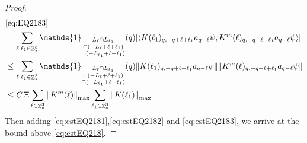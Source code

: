 \documentclass[sn-mathphys, Numbered ,a4paper]{sn-jnl}%
\DeclareMathOperator{\Z}{\mathbb{Z}}
\newcommand{\eva}[1]{\left\langle #1 \right\rangle}
\theoremstyle{plain}
\theoremstyle{definition}
\theoremstyle{remark}
\theoremstyle{plain}
\theoremstyle{definition}
\theoremstyle{remark}
\begin{document}
\begin{proof}
\begin{align}
	& \eqref{eq:EQ2183}\nonumber\\
	&= \sum\limits_{\ell, \ell_1\in \Z^3_*} \mathds{1}_{\substack{L_{\ell}\cap L_{\ell_1}\\\cap (-L_{\ell}+\ell+\ell_1) \\ \cap (-L_{\ell_1}+\ell+\ell_1)}} (q) \abs{\eva{K(\ell_1)_{q,-q+\ell+\ell_1} a_{q-\ell} \psi, K^m(\ell)_{q,-q+\ell+\ell_1} a_{q-\ell}\psi }}\nonumber\\
	&\leq \sum\limits_{\ell, \ell_1\in \Z^3_*} \mathds{1}_{\substack{L_{\ell}\cap L_{\ell_1}\\\cap (-L_{\ell}+\ell+\ell_1) \\ \cap (-L_{\ell_1}+\ell+\ell_1)}} (q) \norm{K(\ell_1)_{q,-q+\ell+\ell_1} a_{q-\ell} \psi}\norm{ K^m(\ell)_{q,-q+\ell+\ell_1} a_{q-\ell}\psi }\nonumber\\
	&\leq C\,\Xi \sum\limits_{\ell \in \Z^3_*} \norm{K^m(\ell)}_{\mathrm{max}} \sum\limits_{\ell_1 \in \Z^3_*} \norm{K(\ell_1)}_{\mathrm{max}}  \label{eq:estEQ2183}
\end{align} 
Then adding \eqref{eq:estEQ2181},\eqref{eq:estEQ2182} and \eqref{eq:estEQ2183}, we arrive at the bound above \eqref{eq:estEQ218}. 
\end{proof}
\end{document}
